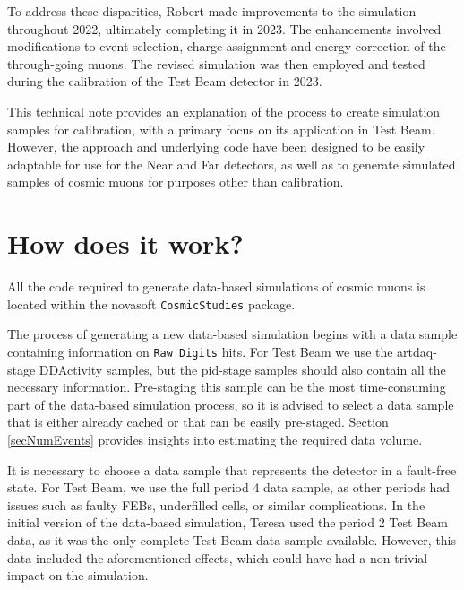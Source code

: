 \documentclass[12pt]{article}
\begin{document}
To address these disparities, Robert made improvements to the simulation throughout 2022, ultimately completing it in 2023. The enhancements involved modifications to event selection, charge assignment and energy correction of the through-going muons. The revised simulation was then employed and tested during the calibration of the Test Beam detector in 2023.

This technical note provides an explanation of the process to create simulation samples for calibration, with a primary focus on its application in Test Beam. However, the approach and underlying code have been designed to be easily adaptable for use for the Near and Far detectors, as well as to generate simulated samples of cosmic muons for purposes other than calibration.

\section{How does it work?}

All the code required to generate data-based simulations of cosmic muons is located within the novasoft \texttt{CosmicStudies} package.

The process of generating a new data-based simulation begins with a data sample containing information on \texttt{Raw Digits} hits. For Test Beam we use the artdaq-stage DDActivity samples, but the pid-stage samples should also contain all the necessary information. Pre-staging this sample can be the most time-consuming part of the data-based simulation process, so it is advised to select a data sample that is either already cached or that can be easily pre-staged. Section \ref{secNumEvents} provides insights into estimating the required data volume.

It is necessary to choose a data sample that represents the detector in a fault-free state. For Test Beam, we use the full period 4 data sample, as other periods had issues such as faulty FEBs, underfilled cells, or similar complications. In the initial version of the data-based simulation, Teresa used the period 2 Test Beam data, as it was the only complete Test Beam data sample available. However, this data included the aforementioned effects, which could have had a non-trivial impact on the simulation.

\end{document}

